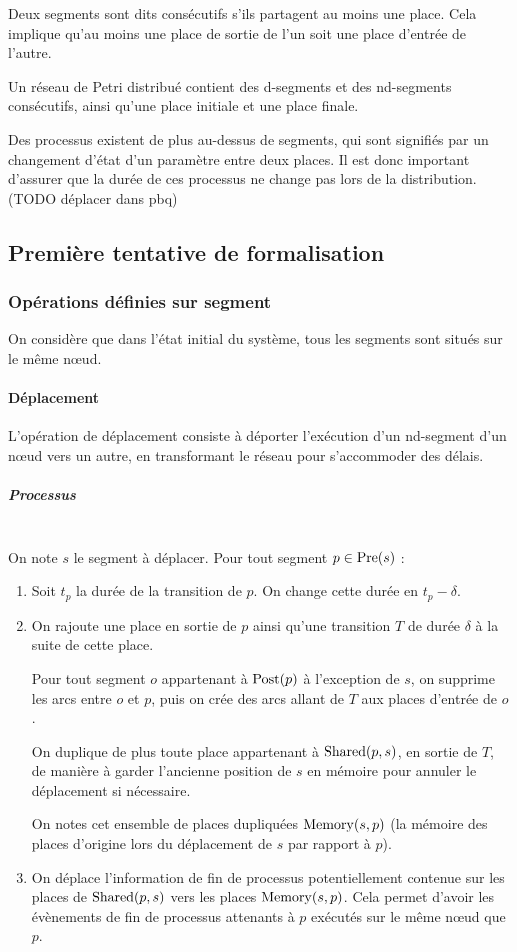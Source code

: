 \begin{mydef}
Deux segments sont dits consécutifs s'ils partagent au moins une place. Cela implique qu'au moins une place de sortie de l'un soit une place d'entrée de l'autre.
\end{mydef}

Un réseau de Petri distribué contient des d-segments et des nd-segments consécutifs, ainsi qu'une place initiale et une place finale.

Des processus existent de plus au-dessus de segments, qui sont signifiés par un changement d'état d'un paramètre entre deux places. Il est donc important d'assurer que la durée de ces processus ne change pas lors de la distribution. (TODO déplacer dans pbq)

\subsection{Première tentative de formalisation}
\subsubsection{Opérations définies sur segment}
On considère que dans l'état initial du système, tous les segments sont situés sur le même nœud.

\paragraph{Déplacement}
L'opération de déplacement consiste à déporter l'exécution d'un nd-segment d'un nœud vers un autre, en transformant le réseau pour s'accommoder des délais.

\subparagraph{Processus} ~ \\

On note $s$ le segment à déplacer.
Pour tout segment $p \in \operatorname{Pre}(s)$ : 

\begin{enumerate}
\item Soit $t_p$ la durée de la transition de $p$. On change cette durée en $t_p - \delta$.
\item On rajoute une place en sortie de $p$ ainsi qu'une transition $T$ de durée $\delta$ à la suite de cette place. 

Pour tout segment $o$ appartenant à $\operatorname{Post}(p)$ à l'exception de $s$, on supprime les arcs entre $o$ et $p$, puis on crée des arcs allant de $T$ aux places d'entrée de $o$.

On duplique de plus toute place appartenant à $\operatorname{Shared}(p, s)$, en sortie de $T$, de manière à garder l'ancienne position de $s$ en mémoire pour annuler le déplacement si nécessaire.

On notes cet ensemble de places dupliquées $\operatorname{Memory}(s, p)$ (la mémoire des places d'origine lors du déplacement de $s$ par rapport à $p$).
 
\item On déplace l'information de fin de processus potentiellement contenue sur les places de $\operatorname{Shared}(p, s)$ vers les places  $\operatorname{Memory}(s, p)$. Cela permet d'avoir les évènements de fin de processus attenants à $p$ exécutés sur le même nœud que $p$.
\end{enumerate}

